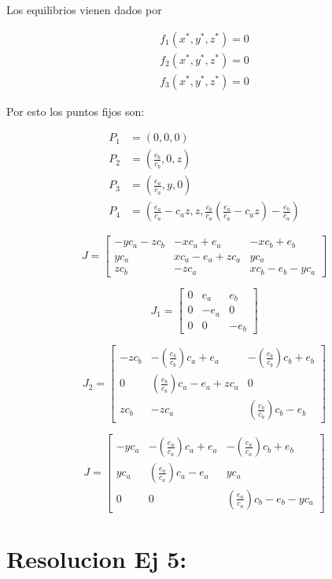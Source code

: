 \documentclass[twocolumn,aps,prl]{revtex4-1}
\begin{document}
Los equilibrios vienen dados por 

$$
\begin{aligned}
    f_1(x^*, y^*, z^*) = 0\\ 
    f_2(x^*, y^*, z^*) = 0\\ 
    f_3(x^*, y^*, z^*) = 0   
\end{aligned}
$$

Por esto los puntos fijos son:

$$
\begin{aligned}
    P_1 &= (0, 0, 0) \\ 
    P_2 &= (\frac{e_b}{c_b}, 0, z) \\ 
    P_3 &= (\frac{e_a}{c_a}, y, 0) \\ 
    P_4 &= (\frac{e_a}{c_a} - c_a z, z, \frac{c_b}{c_a} (\frac{e_a}{c_a} - c_a z) - \frac{e_b}{c_a}) 
\end{aligned}
$$


$$
J = 
\begin{bmatrix}  
    - y c_a - z c_b & - x c_a + e_a & - x c_b + e_b \\
    y c_a & x c_a - e_a + z c_a & y c_a \\
    z c_b & - z c_a & x c_b - e_b - y c_a 
\end{bmatrix}
$$

$$
J_1 = 
\begin{bmatrix}
    0 & e_a & e_b \\
    0 & - e_a & 0 \\
    0 & 0 & - e_b 
\end{bmatrix}
$$

$$
J_2 = 
\begin{bmatrix}  
    - z c_b & - (\frac{e_b}{c_b}) c_a + e_a & - (\frac{e_b}{c_b}) c_b + e_b \\
    0 & (\frac{e_b}{c_b}) c_a - e_a + z c_a & 0 \\
    z c_b & - z c_a & (\frac{e_b}{c_b}) c_b - e_b
\end{bmatrix}
$$


$$
J = 
\begin{bmatrix}  
    - y c_a & - (\frac{e_a}{c_a}) c_a + e_a & - (\frac{e_a}{c_a}) c_b + e_b \\
    y c_a & (\frac{e_a}{c_a}) c_a - e_a  & y c_a \\
    0 & 0 & (\frac{e_a}{c_a}) c_b - e_b - y c_a 
\end{bmatrix}
$$

% 
%                             
% 

\section{Resolucion Ej 5:}




\end{document}
